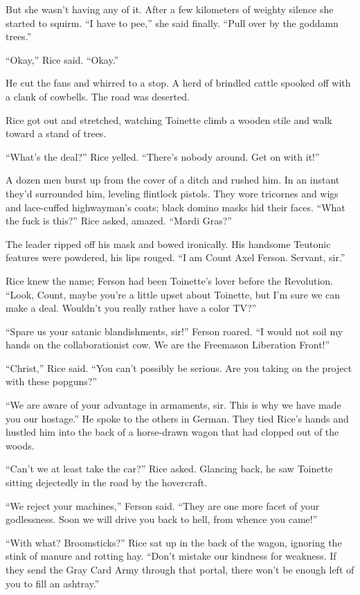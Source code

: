 But she wasn't having any of it. After a few kilometers of weighty silence she started to squirm. ``I have to pee,'' she said finally. ``Pull over by the goddamn trees.''

``Okay,'' Rice said. ``Okay.''

He cut the fans and whirred to a stop. A herd of brindled cattle spooked off with a clank of cowbells. The road was deserted.

Rice got out and stretched, watching Toinette climb a wooden stile and walk toward a stand of trees.

``What's the deal?'' Rice yelled. ``There's nobody around. Get on with it!''

A dozen men burst up from the cover of a ditch and rushed him. In an instant they'd surrounded him, leveling flintlock pistols. They wore tricornes and wigs and lace-cuffed highwayman's coats; black domino masks hid their faces. ``What the fuck is this?'' Rice asked, amazed. ``Mardi Gras?''

The leader ripped off his mask and bowed ironically. His handsome Teutonic features were powdered, his lips rouged. ``I am Count Axel Ferson. Servant, sir.''

Rice knew the name; Ferson had been Toinette's lover before the Revolution. ``Look, Count, maybe you're a little upset about Toinette, but I'm sure we can make a deal. Wouldn't you really rather have a color TV?''

``Spare us your satanic blandishments, sir!'' Ferson roared. ``I would not soil my hands on the collaborationist cow. We are the Freemason Liberation Front!''

``Christ,'' Rice said. ``You can't possibly be serious. Are you taking on the project with these popguns?''

``We are aware of your advantage in armaments, sir. This is why we have made you our hostage.'' He spoke to the others in German. They tied Rice's hands and hustled him into the back of a horse-drawn wagon that had clopped out of the woods.

``Can't we at least take the car?'' Rice asked. Glancing back, he saw Toinette sitting dejectedly in the road by the hovercraft.

``We reject your machines,'' Ferson said. ``They are one more facet of your godlessness. Soon we will drive you back to hell, from whence you came!''

``With what? Broomsticks?'' Rice sat up in the back of the wagon, ignoring the stink of manure and rotting hay. ``Don't mistake our kindness for weakness. If they send the Gray Card Army through that portal, there won't be enough left of you to fill an ashtray.''

